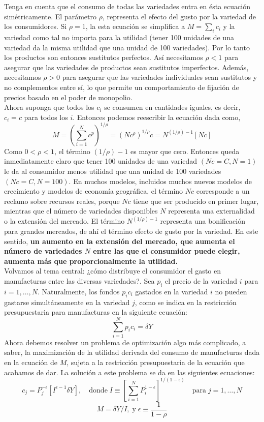 Tenga en cuenta que el consumo de todas las variedades entra en ésta ecuación simétricamente. El parámetro $\rho$, representa el efecto del gusto por la variedad de los consumidores. Si $\rho = 1$, la esta ecuación se simplifica a $M = \sum_i c_i$ y la variedad como tal no importa para la utilidad (tener 100 unidades de una variedad da la misma utilidad que una unidad de 100 variedades). Por lo tanto los productos son entonces sustitutos perfectos. Así necesitamos $\rho < 1$ para asegurar que las variedades de productos sean sustitutos imperfectos. Además, necesitamos $\rho > 0$ para asegurar que las variedades individuales sean sustitutos y no complementos entre sí, lo que permite un comportamiento de fijación de precios basado en el poder de monopolio.\\
Ahora suponga que todos los $c_i$ se consumen en cantidades iguales, es decir, $c_i = c$ para todos los $i$. Entonces podemos reescribir la ecuación dada como,
$$M=\left(\sum_{i=1}^N c^p\right)^{1/\rho}=(Nc^\rho)^{1/\rho}c=N^{(1/\rho) - 1}[Nc]$$
Como $0 < \rho < 1$, el término $(1/\rho) - 1$ es mayor que cero. Entonces queda inmediatamente claro que tener 100 unidades de una variedad $(Nc = C, N = 1)$ le da al consumidor menos utilidad que una unidad de 100 variedades $(Nc = C, N = 100)$. En muchos modelos, incluidos muchos nuevos modelos de crecimiento y modelos de economía geográfica, el término $Nc$  corresponde a un reclamo sobre recursos reales, porque $Nc$ tiene que ser producido en primer lugar, mientras que el número de variedades disponibles $N$ representa una externalidad o la extensión del mercado. El término $N^{(1/\rho)-1}$ representa una bonificación para grandes mercados, de ahí el término efecto de gusto por la variedad. En este sentido, \textbf{un aumento en la extensión del mercado, que aumenta el número de variedades $N$ entre las que el consumidor puede elegir, aumenta más que proporcionalmente la utilidad.}\\
Volvamos al tema central: ¿cómo distribuye el consumidor el gasto en manufacturas entre las diversas variedades?. Sea $p_i$ el precio de la variedad $i$ para $i = 1, \ldots, N$. Naturalmente, los fondos $p_ic_i$ gastados en la variedad $i$ no pueden gastarse simultáneamente en la variedad $j$, como se indica en la restricción presupuestaria para manufacturas en la siguiente ecuación:\\
$$\sum_{i=1}^N p_ic_i=\delta Y$$
Ahora debemos resolver un problema de optimización algo más complicado, a saber, la maximización de la utilidad derivada del consumo de manufacturas dada en la ecuación de $M$, sujeta a la restricción presupuestaria de la ecuación que acabamos de dar. La solución a este problema se da en las siguientes ecuaciones:
$$c_j=P_j^{-\epsilon}[I^{\epsilon-1}\delta Y],\quad \mbox{donde}\; I\equiv \left[\sum_{i=1}^N P_i^{1-\epsilon}\right]^{1/(1-\epsilon)}\quad \mbox{para}\; j=1,\ldots,N$$
$$M=\delta Y/I,\; \mbox{y}\; \epsilon \equiv \dfrac{1}{1-\rho}$$

